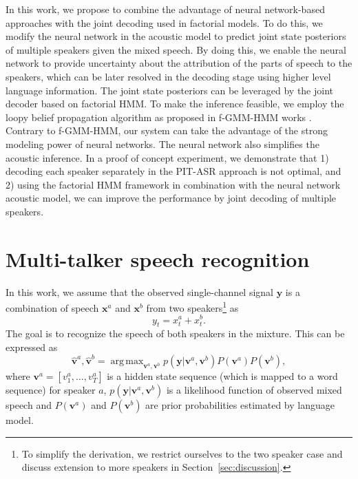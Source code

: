\documentclass[a4paper]{article}
\newcommand{\spkrA}{a}
\newcommand{\spkrB}{b}
\def\x{{\mathbf x}}
\def\y{{\mathbf y}}
\def\w{{\mathbf v}}
\DeclareMathOperator*{\argmax}{arg\,max}
\begin{document}
In this work, we propose to combine the advantage of neural network-based approaches with the joint decoding used in factorial models. To do this, we modify the neural network in the acoustic model to predict joint state posteriors of multiple speakers given the mixed speech. By doing this, we enable the neural network to provide uncertainty about the attribution of the parts of speech to the speakers, which can be later resolved in the decoding stage using higher level language information. The joint state posteriors can be leveraged by the joint decoder based on factorial HMM. To make the inference feasible, we employ the loopy belief propagation algorithm as proposed in f-GMM-HMM works \cite{Rennie2010,rennie2009hierarchical}. Contrary to f-GMM-HMM, our system can take the advantage of the strong modeling power of neural networks. The neural network also simplifies the acoustic inference. In a proof of concept experiment, we demonstrate that 1) decoding each speaker separately in the PIT-ASR approach is not optimal, and 2) using the factorial HMM framework in combination with the neural network acoustic model, we can improve the performance by joint decoding of multiple speakers. 


%
%

\section{Multi-talker speech recognition}
\label{sec:mtsr}

In this work, we assume that the observed single-channel signal $\y$ is a combination of speech $\x^{\spkrA}$ and $\x^{\spkrB}$ from two speakers\footnote{To simplify the derivation, we restrict ourselves to the two speaker case and discuss extension to more speakers in Section~\ref{sec:discussion}.} as
\begin{equation}
    y_t = x_t^\spkrA + x_t^{\spkrB}.
\end{equation}
The goal is to recognize the speech of both speakers in the mixture.
This can be expressed as
\begin{equation}
    \hat{\w}^\spkrA, \hat{\w}^\spkrB = \argmax_{\w^\spkrA, \w^\spkrB} p(\y | \w^\spkrA, \w^\spkrB) P(\w^\spkrA) P(\w^\spkrB),
\end{equation}
where $\w^\spkrA = [v_1^\spkrA, \dots, v_T^\spkrA]$ is a hidden state sequence (which is mapped to a word sequence) for speaker $\spkrA$, $p(\y | \w^\spkrA, \w^\spkrB)$ is a likelihood function of observed mixed speech and $P(\w^\spkrA)$ and $P(\w^\spkrB)$ are prior probabilities estimated by language model.
\end{document}
